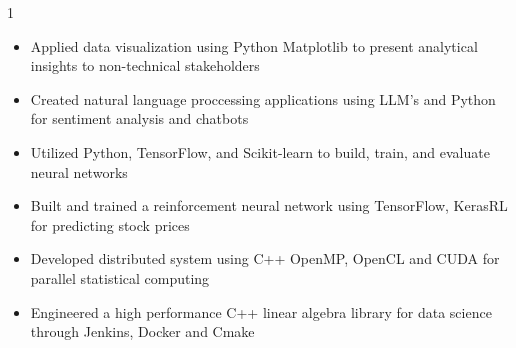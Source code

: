 \documentclass[11pt,a4paper,ragged2e]{altacv}
\begin{document}
\begin{paracol}{1}
\begin{itemize}
\item Applied data visualization using Python Matplotlib to present analytical insights to non-technical stakeholders
\item Created natural language proccessing applications using LLM's and Python for sentiment analysis and chatbots
\item Utilized Python, TensorFlow, and Scikit-learn to build, train, and evaluate neural networks
\item Built and trained a reinforcement neural network using TensorFlow, KerasRL for predicting stock prices
\item Developed distributed system using C++ OpenMP, OpenCL and CUDA for parallel statistical computing
\item Engineered a high performance C++ linear algebra library for data science through Jenkins, Docker and Cmake
\end{itemize}
\tightdivider


\end{paracol}
\end{document}

